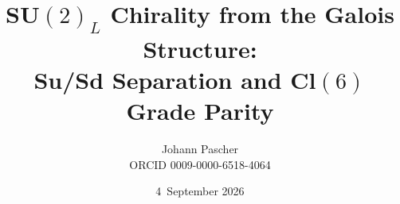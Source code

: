 \documentclass[11pt,a4paper]{report}
\title{SU$(2)_L$ Chirality from the Galois Structure:\\[0.5em]
  \large Su/Sd Separation and Cl$(6)$ Grade Parity}
\date{4~September 2026}
\author{Johann Pascher\\\small ORCID 0009-0000-6518-4064}
\begin{document}
\renewcommand{\thechapter}{}
\renewcommand{\thesection}{\arabic{section}}
\maketitle
\tableofcontents

\end{document}
